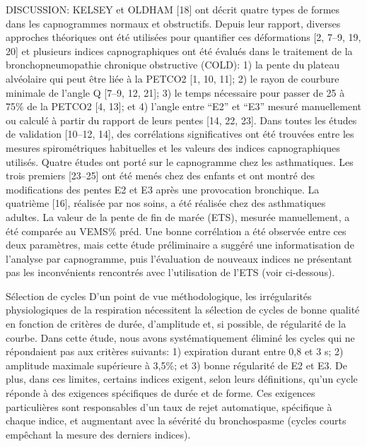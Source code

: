 \documentclass[12pt,]{article}
\begin{document}
DISCUSSION: KELSEY et OLDHAM {[}18{]} ont décrit quatre types de formes
dans les capnogrammes normaux et obstructifs. Depuis leur rapport,
diverses approches théoriques ont été utilisées pour quantifier ces
déformations {[}2, 7--9, 19, 20{]} et plusieurs indices capnographiques
ont été évalués dans le traitement de la bronchopneumopathie chronique
obstructive (COLD): 1) la pente du plateau alvéolaire qui peut être liée
à la PETCO2 {[}1, 10, 11{]}; 2) le rayon de courbure minimale de l'angle
Q {[}7--9, 12, 21{]}; 3) le temps nécessaire pour passer de 25 à 75\% de
la PETCO2 {[}4, 13{]}; et 4) l'angle entre ``E2'' et ``E3'' mesuré
manuellement ou calculé à partir du rapport de leurs pentes {[}14, 22,
23{]}. Dans toutes les études de validation {[}10--12, 14{]}, des
corrélations significatives ont été trouvées entre les mesures
spirométriques habituelles et les valeurs des indices capnographiques
utilisés. Quatre études ont porté sur le capnogramme chez les
asthmatiques. Les trois premiers {[}23--25{]} ont été menés chez des
enfants et ont montré des modifications des pentes E2 et E3 après une
provocation bronchique. La quatrième {[}16{]}, réalisée par nos soins, a
été réalisée chez des asthmatiques adultes. La valeur de la pente de fin
de marée (ETS), mesurée manuellement, a été comparée au VEMS\% préd. Une
bonne corrélation a été observée entre ces deux paramètres, mais cette
étude préliminaire a suggéré une informatisation de l'analyse par
capnogramme, puis l'évaluation de nouveaux indices ne présentant pas les
inconvénients rencontrés avec l'utilisation de l'ETS (voir ci-dessous).

Sélection de cycles D'un point de vue méthodologique, les irrégularités
physiologiques de la respiration nécessitent la sélection de cycles de
bonne qualité en fonction de critères de durée, d'amplitude et, si
possible, de régularité de la courbe. Dans cette étude, nous avons
systématiquement éliminé les cycles qui ne répondaient pas aux critères
suivants: 1) expiration durant entre 0,8 et 3 s; 2) amplitude maximale
supérieure à 3,5\%; et 3) bonne régularité de E2 et E3. De plus, dans
ces limites, certains indices exigent, selon leurs définitions, qu'un
cycle réponde à des exigences spécifiques de durée et de forme. Ces
exigences particulières sont responsables d'un taux de rejet
automatique, spécifique à chaque indice, et augmentant avec la sévérité
du bronchospasme (cycles courts empêchant la mesure des derniers
indices).
\end{document}
